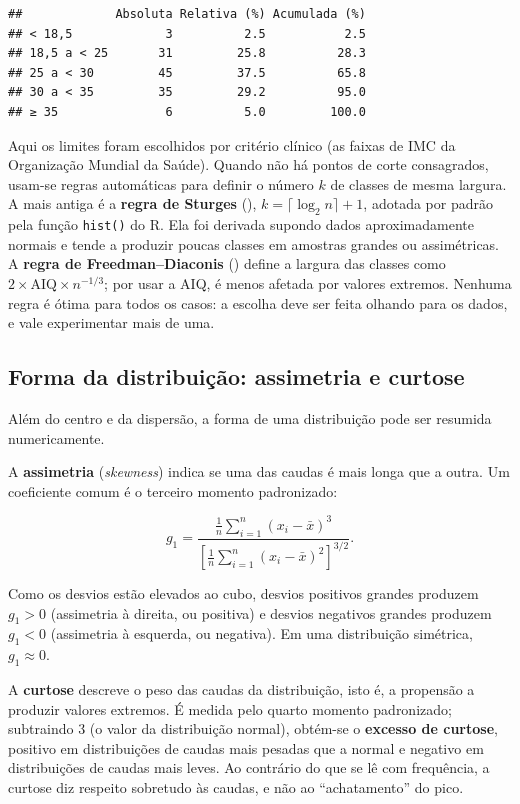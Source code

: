 \documentclass[
]{book}
\begin{document}
\begin{verbatim}
##             Absoluta Relativa (%) Acumulada (%)
## < 18,5             3          2.5           2.5
## 18,5 a < 25       31         25.8          28.3
## 25 a < 30         45         37.5          65.8
## 30 a < 35         35         29.2          95.0
## ≥ 35               6          5.0         100.0
\end{verbatim}

Aqui os limites foram escolhidos por critério clínico (as faixas de IMC da Organização Mundial da Saúde). Quando não há pontos de corte consagrados, usam-se regras automáticas para definir o número \(k\) de classes de mesma largura. A mais antiga é a \textbf{regra de Sturges} (), \(k = \lceil \log_2 n \rceil + 1\), adotada por padrão pela função \texttt{hist()} do R. Ela foi derivada supondo dados aproximadamente normais e tende a produzir poucas classes em amostras grandes ou assimétricas. A \textbf{regra de Freedman--Diaconis} () define a largura das classes como \(2 \times \text{AIQ} \times n^{-1/3}\); por usar a AIQ, é menos afetada por valores extremos. Nenhuma regra é ótima para todos os casos: a escolha deve ser feita olhando para os dados, e vale experimentar mais de uma.

\subsection{Forma da distribuição: assimetria e curtose}\label{forma-da-distribuiuxe7uxe3o-assimetria-e-curtose}

Além do centro e da dispersão, a forma de uma distribuição pode ser resumida numericamente.

A \textbf{assimetria} (\emph{skewness}) indica se uma das caudas é mais longa que a outra. Um coeficiente comum é o terceiro momento padronizado:

\[
g_1 = \frac{\frac{1}{n}\sum_{i=1}^{n}(x_i - \bar{x})^3}{\left[\frac{1}{n}\sum_{i=1}^{n}(x_i - \bar{x})^2\right]^{3/2}}.
\]

Como os desvios estão elevados ao cubo, desvios positivos grandes produzem \(g_1 > 0\) (assimetria à direita, ou positiva) e desvios negativos grandes produzem \(g_1 < 0\) (assimetria à esquerda, ou negativa). Em uma distribuição simétrica, \(g_1 \approx 0\).

A \textbf{curtose} descreve o peso das caudas da distribuição, isto é, a propensão a produzir valores extremos. É medida pelo quarto momento padronizado; subtraindo 3 (o valor da distribuição normal), obtém-se o \textbf{excesso de curtose}, positivo em distribuições de caudas mais pesadas que a normal e negativo em distribuições de caudas mais leves. Ao contrário do que se lê com frequência, a curtose diz respeito sobretudo às caudas, e não ao ``achatamento'' do pico.
\end{document}
